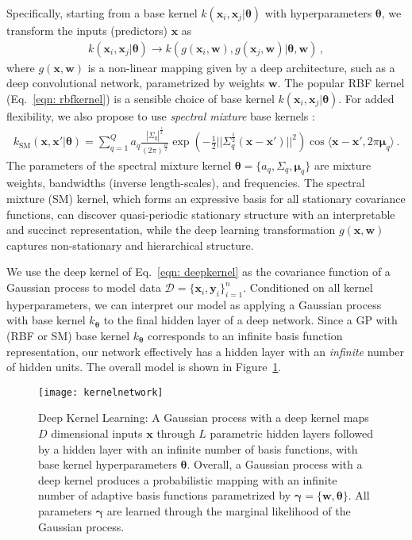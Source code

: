\documentclass[twoside,11pt]{article}
\newcommand{\mbf}[1]{{\boldsymbol{\mathbf{#1}}}}
\renewcommand{\bm}{\mbf}
\begin{document}
Specifically, starting from a base kernel $k(\bm{x}_i,\bm{x}_j | \bm{\theta})$ with hyperparameters
$\bm{\theta}$, we transform the inputs (predictors) $\bm{x}$ as
\begin{align}
k(\bm{x}_i,\bm{x}_j | \bm{\theta}) \to k( g(\bm{x}_i, \bm{w}), g(\bm{x}_j, \bm{w}) | \bm{\theta},\bm{w}) \,,  \label{eqn: deepkernel}
\end{align}
where $g(\bm{x},\bm{w})$ is a non-linear mapping given by a deep architecture, such as a deep
convolutional network, parametrized by weights $\bm{w}$. The popular RBF
kernel (Eq.~\eqref{eqn: rbfkernel}) is a sensible choice of base kernel $k(\bm{x}_i,\bm{x}_j | \bm{\theta})$.
For added flexibility, we also propose to use \emph{spectral mixture} base kernels
\citep{wilsonadams2013}:
\begin{align}
k_{\text{SM}}(\bm{x},\bm{x}' | \bm{\theta}) =   
\sum_{q=1}^Q a_q \frac{|\Sigma_q|^{\frac{1}{2}}}{(2\pi)^{\frac{D}{2}}}
\exp \left(-\frac{1}{2} || \Sigma_q ^{\frac{1}{2}} (\bm{x}-\bm{x}') ||^2 \right )
\cos \langle \bm{x}-\bm{x}', 2\pi \bm{\mu}_q \rangle \,.   \label{eqn: smkernel}
\end{align}
The parameters of the spectral mixture kernel $\bm{\theta} = \{{a}_q, \Sigma_q, \bm{\mu}_q\}$
are mixture weights, bandwidths (inverse length-scales), and frequencies.
The spectral mixture (SM) kernel, which forms an expressive basis for all stationary covariance functions, can
discover quasi-periodic stationary structure with an interpretable and succinct representation,
while the deep learning transformation $g(\bm{x},\bm{w})$ captures non-stationary and hierarchical
structure.

We use the deep kernel of Eq.~\eqref{eqn: deepkernel} as the covariance function of a
Gaussian process to model data $\mathcal{D} = \{\bm{x}_i, \bm{y}_i\}_{i=1}^{n}$.
Conditioned on all kernel hyperparameters, we can interpret our model as applying
a Gaussian process with base kernel $k_\bm{\theta}$ to the final hidden layer of a
deep network.  Since a GP with (RBF or SM) base kernel $k_\bm{\theta}$ corresponds to an
infinite basis function representation, our network
effectively has a hidden layer with an \emph{infinite} number of hidden units.
The overall model is shown in Figure~\ref{fig: klearnfig}.

\begin{figure}[t!]
\centering
\texttt{[image: kernelnetwork]}

\caption{\small Deep Kernel Learning: A Gaussian process with a deep kernel maps $D$ dimensional inputs $\bm{x}$ through
$L$ parametric hidden layers 
followed by a hidden layer with  an infinite number of basis functions, with base kernel hyperparameters $\bm{\theta}$. Overall,
a Gaussian process with a deep kernel produces a probabilistic mapping with an infinite number of adaptive basis
functions parametrized by $\bm{\gamma} = \{\bm{w},\bm{\theta}\}$.  All parameters $\bm{\gamma}$ are learned through the marginal likelihood
of the Gaussian process.}
\label{fig: klearnfig}
\end{figure}
\end{document}
